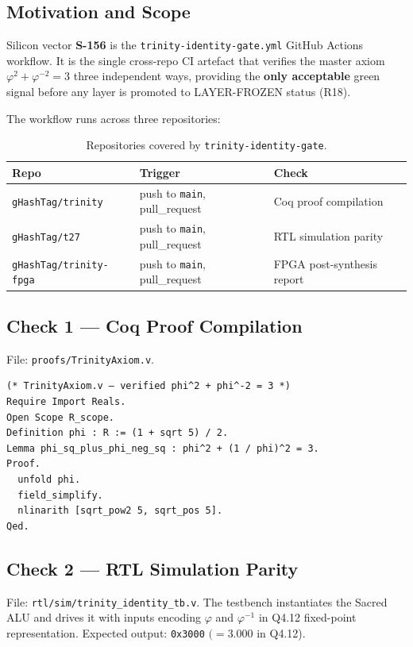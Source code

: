 \subsection{Motivation and Scope}

Silicon vector \textbf{S-156} is the \texttt{trinity-identity-gate.yml}
GitHub Actions workflow.
It is the single cross-repo CI artefact that verifies the master axiom
\(\varphi^2 + \varphi^{-2} = 3\) three independent ways, providing the
\textbf{only acceptable} green signal before any layer is promoted to
LAYER-FROZEN status (R18).

The workflow runs across three repositories:

\begin{table}[h]
\centering
\caption{Repositories covered by \texttt{trinity-identity-gate}.}
\label{tab:ci-repos}
\begin{tabular}{lll}
\hline
Repo & Trigger & Check \\
\hline
\texttt{gHashTag/trinity} & push to \texttt{main}, pull\_request & Coq proof compilation \\
\texttt{gHashTag/t27} & push to \texttt{main}, pull\_request & RTL simulation parity \\
\texttt{gHashTag/trinity-fpga} & push to \texttt{main}, pull\_request & FPGA post-synthesis report \\
\hline
\end{tabular}
\end{table}

\subsection{Check 1 — Coq Proof Compilation}

File: \texttt{proofs/TrinityAxiom.v}.

\begin{verbatim}
(* TrinityAxiom.v — verified phi^2 + phi^-2 = 3 *)
Require Import Reals.
Open Scope R_scope.
Definition phi : R := (1 + sqrt 5) / 2.
Lemma phi_sq_plus_phi_neg_sq : phi^2 + (1 / phi)^2 = 3.
Proof.
  unfold phi.
  field_simplify.
  nlinarith [sqrt_pow2 5, sqrt_pos 5].
Qed.
\end{verbatim}

\subsection{Check 2 — RTL Simulation Parity}

File: \texttt{rtl/sim/trinity\_identity\_tb.v}.
The testbench instantiates the Sacred ALU and drives it with inputs encoding
\(\varphi\) and \(\varphi^{-1}\) in Q4.12 fixed-point representation.
Expected output: \texttt{0x3000} \((= 3.000\) in Q4.12).

